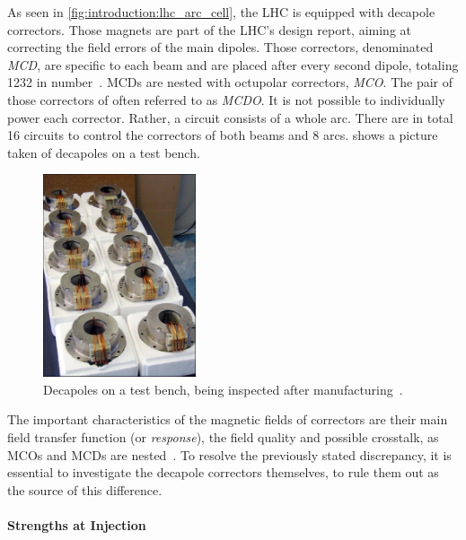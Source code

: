 As seen in \cref{fig:introduction:lhc_arc_cell}, the LHC is equipped with decapole correctors. Those
magnets are part of the LHC's design report, aiming at correcting the field errors of the main
dipoles.  Those correctors, denominated \textit{MCD}, are specific to each beam and are placed after
every second dipole, totaling 1232 in number~\cite{venturini_delsolaro_magnetic_2005}.  MCDs are
nested with octupolar correctors, \textit{MCO}. The pair of those correctors of often referred to as
\textit{MCDO}. 
It is not possible to individually power each corrector. Rather, a circuit consists of a whole arc.
There are in total 16 circuits to control the correctors of both beams and 8 arcs.
 shows a picture taken of decapoles on a test bench.

\begin{figure}
    \centering
    \includegraphics[width=0.4\textwidth]{./images/decapoles_real_pic.jpg}
    \caption{Decapoles on a test bench, being inspected after
    manufacturing~\cite{noauthor_ten_2001}.}
    \label{fig:decapoles:decapole_picture}
\end{figure}


The important characteristics of the magnetic fields of correctors are their main field transfer
function (or \textit{response}), the field quality and possible crosstalk, as MCOs and MCDs are
nested~\cite{venturini_delsolaro_magnetic_2005}. To resolve the previously stated discrepancy, it is
essential to investigate the decapole correctors themselves, to rule them out as the source of this
difference.

\paragraph{Strengths at Injection}

